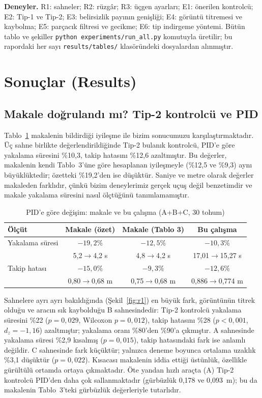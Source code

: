 \documentclass[conference,a4paper]{IEEEtran}
\begin{document}
\textbf{Deneyler.} R1: sahneler; R2: rüzgâr; R3: üçgen ayarları; E1: önerilen kontrolcü; E2: Tip-1 ve Tip-2; E3: belirsizlik payının genişliği; E4: görüntü titremesi ve kaybolma; E5: parçacık filtresi ve gecikme; E6: tip indirgeme yöntemi. Bütün tablo ve şekiller \texttt{python experiments/run\_all.py} komutuyla üretilir; bu rapordaki her sayı \texttt{results/tables/} klasöründeki dosyalardan alınmıştır.

\section{Sonuçlar (Results)}
\subsection{Makale doğrulandı mı? Tip-2 kontrolcü ve PID}
Tablo~\ref{tab:repro} makalenin bildirdiği iyileşme ile bizim sonucumuzu karşılaştırmaktadır. Üç sahne birlikte değerlendirildiğinde Tip-2 bulanık kontrolcü, PID'e göre yakalama süresini \%10,3, takip hatasını \%12,6 azaltmıştır. Bu değerler, makalenin kendi Tablo~3'üne göre hesaplanan iyileşmeyle (\%12,5 ve \%9,3) aynı büyüklüktedir; özetteki \%19,2'den ise düşüktür. Saniye ve metre olarak değerler makaleden farklıdır, çünkü bizim deneylerimiz gerçek uçuş değil benzetimdir ve makale yakalama süresini nasıl ölçtüğünü tanımlamamıştır.

\begin{table}[t]
\centering
\caption{PID'e göre değişim: makale ve bu çalışma (A+B+C, 30 tohum)}
\label{tab:repro}
\footnotesize
\begin{tabular}{@{}lccc@{}}
\toprule
Ölçüt & Makale (özet) & Makale (Tablo 3) & Bu çalışma \\
\midrule
Yakalama süresi & $-19{,}2$\% & $-12{,}5$\% & $-10{,}3$\% \\
 & 5,2$\to$4,2 s & 4,8$\to$4,2 s & 17,01$\to$15,27 s \\
Takip hatası & $-15{,}0$\% & $-9{,}3$\% & $-12{,}6$\% \\
 & 0,80$\to$0,68 m & 0,75$\to$0,68 m & 0,886$\to$0,774 m \\
\bottomrule
\end{tabular}
\end{table}

Sahnelere ayrı ayrı bakıldığında (Şekil~\ref{fig:r1}) en büyük fark, görüntünün titrek olduğu ve aracın sık kaybolduğu B sahnesindedir: Tip-2 kontrolcü yakalama süresini \%22 ($p=0{,}029$, Wilcoxon $p=0{,}012$), takip hatasını \%28 ($p<0{,}001$, $d_z=-1{,}16$) azaltmıştır; yakalama oranı \%80'den \%90'a çıkmıştır. A sahnesinde yakalama süresi \%2,9 kısalmış ($p=0{,}015$), takip hatasındaki fark ise anlamlı değildir. C sahnesinde fark küçüktür; yalnızca deneme boyunca ortalama uzaklık \%3,1 düşüktür ($p=0{,}022$). Kısacası makalenin iddia ettiği üstünlük, özellikle gürültülü ortamda ortaya çıkmaktadır. Öte yandan hızlı araçta (A) Tip-2 kontrolcü PID'den daha çok sallanmaktadır (gürbüzlük 0,178 ve 0,093~m); bu da makalenin Tablo~3'teki gürbüzlük değerleriyle tutarlıdır.
\end{document}
